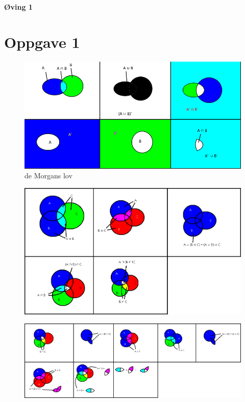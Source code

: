 \begin{center}
	\LARGE{\textbf{Øving 1}}
\end{center}


\section*{Oppgave 1}

\begin{figure}[htb!]
	\centering
	\includegraphics[width = 14cm]{Figurer/1A.png}
	\caption*{de Morgans lov}
	\label{fig:1}
\end{figure}

\begin{figure}[htb!]
	\centering
	\includegraphics[width = 14cm]{Figurer/1B.png}
\end{figure}

\newpage

\begin{figure}[htb!]
	\centering
	\includegraphics[width = 14cm]{Figurer/1C.png}
\end{figure}


